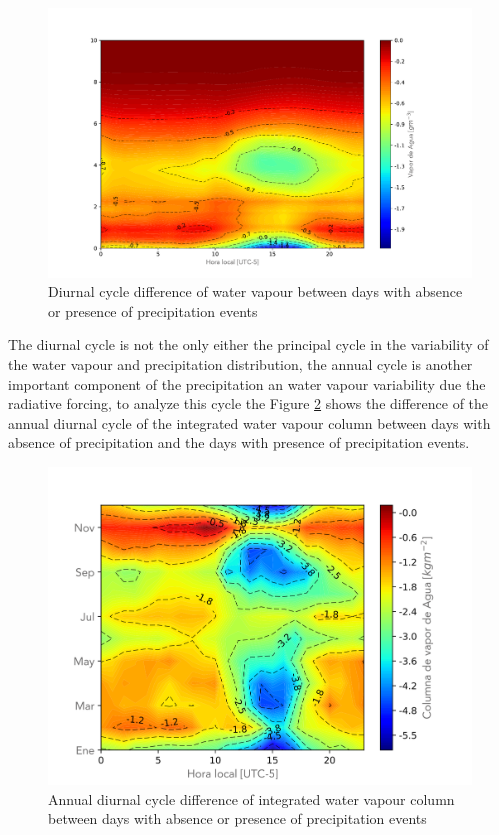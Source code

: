 \documentclass{ametsoc}
\begin{document}
\begin{figure}[h!]
\centering
\includegraphics[width=1.2\linewidth]{Figuras/V_C_Matrix_resta.pdf}
\caption{Diurnal cycle difference of water vapour between days with absence or presence of precipitation events }
\label{fig:vapourDifference}
\end{figure}

The diurnal cycle  is not the only either the principal cycle in the variability of the water vapour and precipitation distribution, the annual cycle is another important component of the precipitation an water vapour variability due the radiative forcing, to analyze this cycle the Figure \ref{fig:VapDifference} shows the difference of the annual diurnal cycle of the integrated water vapour column between days with absence of precipitation and the days with presence of precipitation events. 

\begin{figure}[h!]
\centering
\includegraphics[width=1.0\linewidth]{Figuras/Vap_Resta_Matrix.png}
\caption{Annual diurnal cycle difference of integrated water vapour column between days with absence or presence of precipitation events }
\label{fig:VapDifference}
\end{figure}
\end{document}

